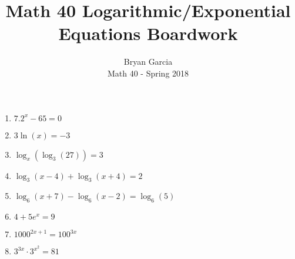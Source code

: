 \documentclass[12pt]{article}
\begin{document}
 
 
\title{Math 40 Logarithmic/Exponential Equations Boardwork}%
\author{Bryan Garcia\\ %
Math 40 - Spring 2018} %
 
\maketitle

\begin{enumerate}[label=\alph*)]
    \item $7.2^x-65=0$
    \item $3\ln(x)=-3$
    \item $\log_x(\log_3(27))=3$
    \item $\log_3(x-4)+\log_3(x+4)=2$
    \item $\log_6(x+7)-\log_6(x-2)=\log_6(5)$
    \item $4+5e^x=9$
    \item $1000^{2x+1}= 100^{3x}$
    \item $3^{3x}\cdot3^{x^2}=81$
\end{enumerate}
\end{document}
